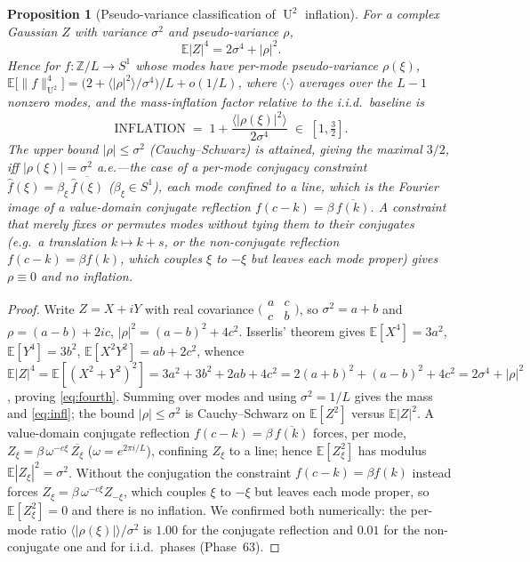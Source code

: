 \documentclass[11pt]{article}
\newtheorem{proposition}{Proposition}
\theoremstyle{definition}
\newcommand{\Z}{\mathbb{Z}}
\DeclareMathOperator{\Uk}{U}
\begin{document}
\begin{proposition}[Pseudo-variance classification of $\Uk^2$
inflation]\label{prop:pseudovar}
For a complex Gaussian $Z$ with variance $\sigma^2$ and pseudo-variance
$\rho$,
\begin{equation}\label{eq:fourth}
\mathbb E|Z|^4=2\sigma^4+|\rho|^2 .
\end{equation}
Hence for $f\colon\Z/L\to S^1$ whose modes have per-mode pseudo-variance
$\rho(\xi)$,
$\mathbb E\big[\|f\|_{\Uk^2}^4\big]
=\big(2+\langle|\rho|^2\rangle/\sigma^4\big)/L+o(1/L)$, where
$\langle\cdot\rangle$ averages over the $L-1$ nonzero modes, and the
mass-inflation factor relative to the i.i.d.\ baseline is
\begin{equation}\label{eq:infl}
\text{INFLATION}\;=\;1+\frac{\langle|\rho(\xi)|^2\rangle}{2\sigma^4}\;\in\;[1,\tfrac32].
\end{equation}
The upper bound $|\rho|\le\sigma^2$ (Cauchy--Schwarz) is attained, giving
the maximal $3/2$, \emph{iff} $|\rho(\xi)|=\sigma^2$ a.e.---the case of a
per-mode conjugacy constraint $\hat f(\xi)=\beta_\xi\,\overline{\hat
f(\xi)}$ ($\beta_\xi\in S^1$), each mode confined to a line, which is the
Fourier image of a value-domain \emph{conjugate} reflection
$f(c-k)=\beta\,\overline{f(k)}$. A constraint that merely fixes or
permutes modes without tying them to their conjugates (e.g.\ a
translation $k\mapsto k+s$, or the non-conjugate reflection
$f(c-k)=\beta f(k)$, which couples $\xi$ to $-\xi$ but leaves each mode
proper) gives $\rho\equiv0$ and no inflation.
\end{proposition}

\begin{proof}
Write $Z=X+iY$ with real covariance $\big(\begin{smallmatrix}a&c\\
c&b\end{smallmatrix}\big)$, so $\sigma^2=a+b$ and $\rho=(a-b)+2ic$,
$|\rho|^2=(a-b)^2+4c^2$. Isserlis' theorem gives $\mathbb E[X^4]=3a^2$,
$\mathbb E[Y^4]=3b^2$, $\mathbb E[X^2Y^2]=ab+2c^2$, whence
$\mathbb E|Z|^4=\mathbb E[(X^2+Y^2)^2]=3a^2+3b^2+2ab+4c^2
=2(a+b)^2+(a-b)^2+4c^2=2\sigma^4+|\rho|^2$, proving \eqref{eq:fourth}.
Summing over modes and using $\sigma^2=1/L$ gives the mass and
\eqref{eq:infl}; the bound $|\rho|\le\sigma^2$ is Cauchy--Schwarz on
$\mathbb E[Z^2]$ versus $\mathbb E|Z|^2$. A value-domain conjugate
reflection $f(c-k)=\beta\,\overline{f(k)}$ forces, per mode,
$Z_\xi=\beta\,\omega^{-c\xi}\,\overline{Z_\xi}$ ($\omega=e^{2\pi i/L}$),
confining $Z_\xi$ to a line; hence $\mathbb E[Z_\xi^2]$ has modulus
$\mathbb E|Z_\xi|^2=\sigma^2$. Without the conjugation the constraint
$f(c-k)=\beta f(k)$ instead forces $Z_\xi=\beta\,\omega^{-c\xi}Z_{-\xi}$,
which couples $\xi$ to $-\xi$ but leaves each mode proper, so
$\mathbb E[Z_\xi^2]=0$ and there is no inflation. We confirmed both
numerically: the per-mode ratio $\langle|\rho(\xi)|\rangle/\sigma^2$ is
$1.00$ for the conjugate reflection and $0.01$ for the non-conjugate one
and for i.i.d.\ phases (Phase~63).
\end{proof}
\end{document}
